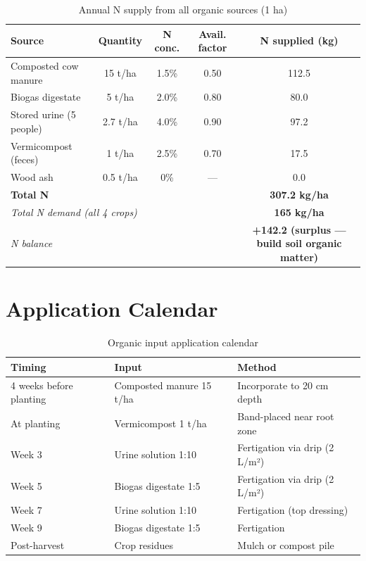 \documentclass[12pt,a4paper,openany]{book}
\begin{document}
\begin{table}[H]
\centering
\caption{Annual N supply from all organic sources (1 ha)}
\renewcommand{\arraystretch}{1.3}
\begin{tabular}{lcccc}
\toprule
\textbf{Source}&\textbf{Quantity}&\textbf{N conc.}&\textbf{Avail. factor}&\textbf{N supplied (kg)}\\
\midrule
Composted cow manure & 15 t/ha & 1.5\% & 0.50 & 112.5\\
Biogas digestate & 5 t/ha & 2.0\% & 0.80 & 80.0\\
Stored urine (5 people) & 2.7 t/ha & 4.0\% & 0.90 & 97.2\\
Vermicompost (feces) & 1 t/ha & 2.5\% & 0.70 & 17.5\\
Wood ash & 0.5 t/ha & 0\% & — & 0.0\\
\midrule
\textbf{Total N} & & & & \textbf{307.2 kg/ha}\\
\midrule
\multicolumn{4}{l}{\textit{Total N demand (all 4 crops)}} & \textbf{165 kg/ha}\\
\multicolumn{4}{l}{\textit{N balance}} & \textbf{+142.2 (surplus — build soil organic matter)}\\
\bottomrule
\end{tabular}
\end{table}

\section{Application Calendar}

\begin{table}[H]
\centering
\caption{Organic input application calendar}
\renewcommand{\arraystretch}{1.3}
\begin{tabular}{lll}
\toprule
\textbf{Timing}&\textbf{Input}&\textbf{Method}\\
\midrule
4 weeks before planting & Composted manure 15 t/ha & Incorporate to 20 cm depth\\
At planting & Vermicompost 1 t/ha & Band-placed near root zone\\
Week 3 & Urine solution 1:10 & Fertigation via drip (2 L/m²)\\
Week 5 & Biogas digestate 1:5 & Fertigation via drip (2 L/m²)\\
Week 7 & Urine solution 1:10 & Fertigation (top dressing)\\
Week 9 & Biogas digestate 1:5 & Fertigation\\
Post-harvest & Crop residues & Mulch or compost pile\\
\bottomrule
\end{tabular}
\end{table}
\end{document}
